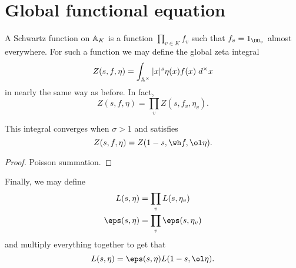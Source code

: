 \section{Global functional equation}
A Schwartz function on $\AA_K$ is a function $\prod_{v \in K} f_v$
such that $f_v = 1_{\OO_v}$ almost everywhere.
For such a function we may define the global zeta integral
\[ Z(s, f, \eta) = \int_{\AA^\times} |x|^s \eta(x) f(x) \; d^\times x \]
in nearly the same way as before.
In fact,
\[ Z(s, f, \eta) = \prod_v Z(s, f_v, \eta_v). \]

\begin{theorem}
  This integral converges when $\sigma > 1$ and satisfies
  \[ Z(s, f, \eta) = Z(1-s, \wh f, \ol\eta). \]
\end{theorem}
\begin{proof}
  Poisson summation.
\end{proof}

Finally, we may define
\begin{align*}
  L(s, \eta) &= \prod_v L(s, \eta_v) \\
  \eps(s, \eta) &= \prod_v \eps(s, \eta_v)
\end{align*}
and multiply everything together to get that
\[ L(s, \eta) = \eps(s, \eta) L(1-s, \ol \eta). \]
